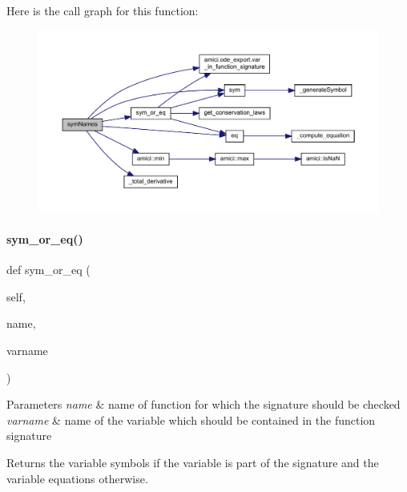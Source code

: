 Here is the call graph for this function\+:
\nopagebreak
\begin{figure}[H]
\begin{center}
\leavevmode
\includegraphics[width=350pt]{classamici_1_1ode__export_1_1_o_d_e_model_a2223bbe62f3234b8f40c5a566064a481_cgraph}
\end{center}
\end{figure}
\mbox{\label{classamici_1_1ode__export_1_1_o_d_e_model_ae352b13e8ea2f390c5fa146601817173}} 
\paragraph{\texorpdfstring{sym\_or\_eq()}{sym\_or\_eq()}}
{\footnotesize\ttfamily def sym\+\_\+or\+\_\+eq (\begin{DoxyParamCaption}\item[{}]{self,  }\item[{}]{name,  }\item[{}]{varname }\end{DoxyParamCaption})}


\begin{DoxyParams}{Parameters}
{\em name} & name of function for which the signature should be checked \\
\hline
{\em varname} & name of the variable which should be contained in the function signature\\
\hline
\end{DoxyParams}
\begin{DoxyReturn}{Returns}
the variable symbols if the variable is part of the signature and the variable equations otherwise. 
\end{DoxyReturn}



